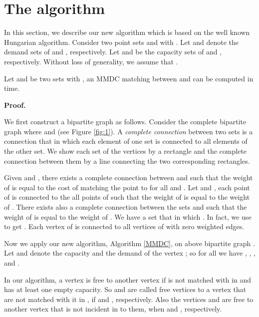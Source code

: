 \documentclass[preprint,12pt]{elsarticle}
\begin{document}
\section{The algorithm}
\label{newalgorithms}
In this section, we describe our new algorithm which is based on the well known Hungarian algorithm. Consider two point sets  and  with . Let  and  denote the demand sets of  and , respectively. Let  and  be the capacity sets of  and , respectively. Without loss of generality, we assume that . 

\begin{theorem}
Let  and  be two sets with , an MMDC matching between  and  can be computed in  time.
\end{theorem}

\textbf {Proof.} 

We first construct a bipartite graph as follows. Consider the complete bipartite graph  where  and  (see Figure \ref{fig:1}). 
A \textit {complete connection} between two sets is a connection that in which each element of one set is connected to all elements of the other set. We show each set of the vertices by a rectangle and the complete connection between them by a line connecting the two corresponding rectangles. 

Given  and , there exists a complete connection between  and  such that the weight of  is equal to the cost of matching the point  to  for all  and . Let  and , each point of  is connected to the all points of  such that the weight of  is equal to the weight of . There exists also a complete connection between the sets  and  such that the weight of  is equal to the weight of . We have a set  that in which . In fact, we use  to get . Each vertex of  is connected to all vertices of  with zero weighted edges. 



Now we apply our new algorithm, Algorithm \ref{MMDC}, on above bipartite graph . Let  and  denote the capacity and the demand of the vertex ; so for all  we have , , , and . 

In our algorithm, a vertex  is free to another vertex  if  is not matched with  in  and has at least one empty capacity.  
So  and  are called free vertices to a vertex  that are not matched with it in , if \newline  and , respectively. \newline Also the vertices  and  are free to another vertex that is not incident in  to them, when \newline  and , respectively.
\end{document}
